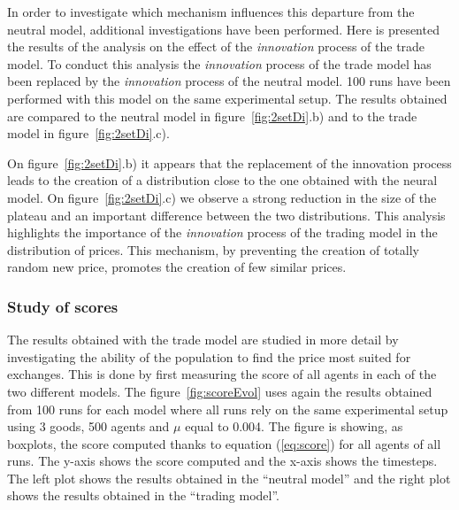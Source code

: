 \documentclass[a4paper]{article}
\begin{document}
In order to investigate which mechanism influences this departure from the neutral model, additional investigations have been performed. Here is presented the results of the analysis on the effect of the \emph{innovation} process of the trade model. To conduct this analysis the \emph{innovation} process of the trade model has been replaced by the \emph{innovation} process of the neutral model. 100 runs have been performed with this model on the same experimental setup. The results obtained are compared to the neutral model in figure~\ref{fig:2setDi}.b) and to the trade model in figure~\ref{fig:2setDi}.c). 

On figure~\ref{fig:2setDi}.b) it appears that the replacement of the innovation process leads to the creation of a distribution close to the one obtained with the neural model. On figure~\ref{fig:2setDi}.c) we observe a strong reduction in the size of the plateau and an important difference between the two distributions. This analysis highlights the importance of the \emph{innovation} process of the trading model in the distribution of prices. This mechanism, by preventing the creation of totally random new price, promotes the creation of few similar prices.


\subsubsection{Study of scores}

The results obtained with the trade model are studied in more detail by investigating the ability of the population to find the price most suited for exchanges. This is done by first measuring the score of all agents in each of the two different models. The figure~\ref{fig:scoreEvol} uses again the results obtained from 100 runs for each model where all runs rely on the same experimental setup using 3 goods, 500 agents and $\mu$ equal to 0.004. The figure is showing, as boxplots, the score computed thanks to equation (\ref{eq:score}) for all agents of all runs. The y-axis shows the score computed and the x-axis shows the timesteps. The left plot shows the results obtained in the ``neutral model'' and the right plot shows the results obtained in the ``trading model''.
\end{document}
